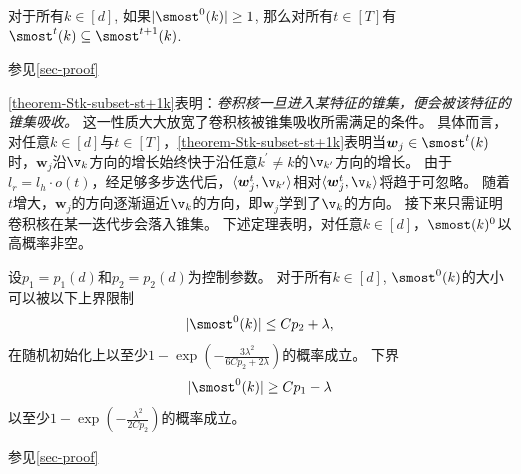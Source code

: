 \begin{theorem}\label{theorem-Stk-subset-st+1k}
    对于所有$k \in [d]$, 如果$|\smost^{0}(k)| \geq 1$, 那么对所有$t \in [T]$有$\smost^{t}(k) \subseteq \smost^{t+1}(k)$.
\end{theorem}

\begin{myproof}
    参见\cref{sec-proof}
    \end{myproof}

\cref{theorem-Stk-subset-st+1k}表明：\emph{卷积核一旦进入某特征的锥集，便会被该特征的锥集吸收。}
这一性质大大放宽了卷积核被锥集吸收所需满足的条件。
具体而言，对任意$k \in [d]$与$t \in [T]$，\cref{theorem-Stk-subset-st+1k}表明当$\boldsymbol{w}_j \in \smost^t(k)$时，$\boldsymbol{w}_j$沿$\v_k$方向的增长始终快于沿任意$ k^{\prime} \neq k$的$\v_{k^{\prime}}$方向的增长。
由于$l_r = l_h \cdot o(t)$，经足够多步迭代后，$\langle \boldsymbol{w}_{j}^{t}, \v_{k^{\prime}} \rangle$相对$ \langle  \boldsymbol{w}_j^{t} , \v_{k} \rangle$将趋于可忽略。
随着$t$增大，$\boldsymbol{w}_j$的方向逐渐逼近$\v_k$的方向，即$\boldsymbol{w}_j$学到了$\v_k$的方向。
接下来只需证明卷积核在某一迭代步会落入锥集。
下述定理表明，对任意$ k \in [d]$，$\smost(k)^{0}$以高概率非空。
\begin{theorem}\label{theorem-initial-size-in-paper}
设$p_1 = p_1(d)$和$p_2 = p_2(d)$为控制参数。
对于所有$ k \in [d]$, $\smost^0(k)$的大小可以被以下上界限制
\begin{equation}\label{eq-lemma-init-prob-smost-result-upper-bound}
     | \smost^0(k) |  \leq C p_2 + \lambda,
\end{equation}
在随机初始化上以至少$ 1 - \exp\left( - \frac{3\lambda^2}{6C p_2 + 2\lambda} \right)$的概率成立。
下界
\begin{equation}\label{eq-lemma-init-prob-smost-result-lower-bound}
    | \smost^0(k) | \geq C p_1 - \lambda
\end{equation}
以至少$1 - \exp \left( - \frac{\lambda^2}{2 C p_2} \right)$的概率成立。
\end{theorem}

\begin{myproof}
    参见\cref{sec-proof}
\end{myproof}

